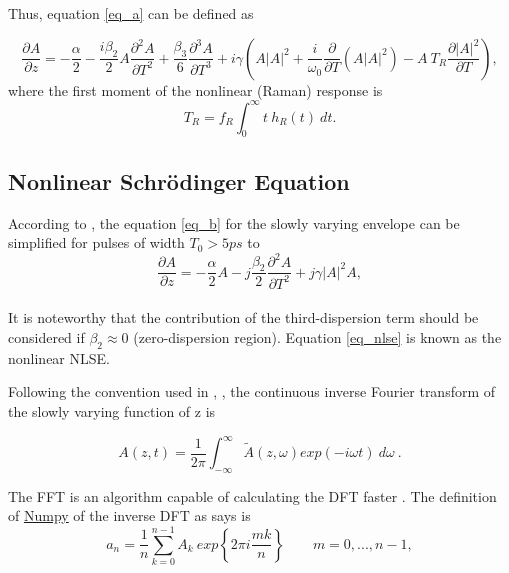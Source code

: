     Thus, equation \eqref{eq_a} can be defined as 
    
    \begin{equation}\label{eq_b}
        \frac{\partial A}{\partial z}=-\frac{\alpha}{2} - \frac{i \beta_2}{2}A \frac{\partial^2 A}{\partial T^2} +\frac{\beta_3}{6} \frac{\partial^3 A}{\partial T^3} +i \gamma   \left(A\left|A\right|^2+ \frac{i}{\omega_0} \frac{\partial}{\partial T} (A\left|A \right|^2)- A \ T_R \frac{\partial \left|A \right|^2}{\partial T} \right),
        \end{equation}
    where the first moment of the nonlinear (Raman) response is
    \begin{equation}\label{eq_TR}
        T_R = f_R\int_{0}^{\infty} t \ h_R(t) \ dt.
    \end{equation}

        
    \subsection{Nonlinear Schrödinger Equation}
        According to \citep{AgrawalBook}, the equation  \eqref{eq_b} for the slowly varying envelope can be simplified for pulses of width $T_0 > 5 ps$ to
        \begin{equation}
                \frac{\partial A}{\partial z} = -\frac{\alpha}{2}A-j \frac{\beta_2}{2}\frac{\partial^2A}{\partial T^2}+j\gamma|A|^2 A,
                \label{eq_nlse}
            \end{equation}
            \ \\
       It is noteworthy that the contribution of the third-dispersion term should be considered if $\beta_2 \approx 0$ (zero-dispersion region). Equation \eqref{eq_nlse} is known as the nonlinear \gls{NLSE}. %

           Following the convention used in \cite{AgrawalBook}, \cite{dudley_taylor_2010} , the continuous inverse Fourier transform of the slowly varying function of z is
        
        \begin{equation}\label{eq_acft}
            A(z,t) = \frac{1}{2\pi} \int_{-\infty}^{\infty} %
            \tilde{A}(z,\omega)exp(-i\omega t) \ d\omega \ .
        \end{equation}
        
        
        The \Gls{FFT} is an algorithm capable of calculating the \Gls{DFT} faster \citep{Lynch2018}. The definition of \href{https://numpy.org/doc/stable/index.html}{Numpy} of the inverse \Gls{DFT} as \cite{dft} says is 
        \begin{equation}\label{eq_dft}
            a_n = \frac{1}{n}\sum_{k=0}^{n-1} A_k \ exp\left\{ 2\pi i \frac{mk}{n} \right\} \qquad m = 0,...,n-1,
        \end{equation}

